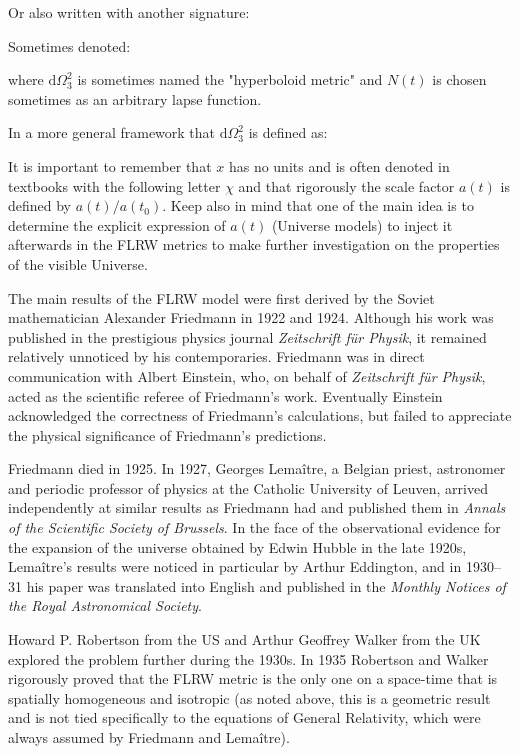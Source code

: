 	Or also written with another signature:
	
	Sometimes denoted:
	
	where $\mathrm{d}\Omega^2_3$ is sometimes named the "hyperboloid metric" and $N(t)$ is chosen sometimes as an arbitrary lapse function. 
	
	\begin{tcolorbox}[title=Remark,colframe=black,arc=10pt]
	In a more general framework that $\mathrm{d}\Omega^2_3$ is defined as:
	
	\end{tcolorbox}
	
	It is important to remember that $x$ has no units and is often denoted in textbooks with the following letter $\chi$ and that rigorously the scale factor $a(t)$ is defined by $a(t)/a(t_0)$. Keep also in mind that one of the main idea is to determine the explicit expression of $a(t)$ (Universe models) to inject it afterwards in the FLRW metrics to make further investigation on the properties of the visible Universe.

	The main results of the FLRW model were first derived by the Soviet mathematician Alexander Friedmann in 1922 and 1924. Although his work was published in the prestigious physics journal \textit{Zeitschrift für Physik}, it remained relatively unnoticed by his contemporaries. Friedmann was in direct communication with Albert Einstein, who, on behalf of \textit{Zeitschrift für Physik}, acted as the scientific referee of Friedmann's work. Eventually Einstein acknowledged the correctness of Friedmann's calculations, but failed to appreciate the physical significance of Friedmann's predictions.
	
	Friedmann died in 1925. In 1927, Georges Lemaître, a Belgian priest,	astronomer and periodic professor of physics at the Catholic University of Leuven, arrived independently at similar results as Friedmann had and published them in \textit{Annals of the Scientific Society of Brussels}. In the face of the observational evidence for the expansion of the universe obtained by Edwin Hubble in the late 1920s, Lemaître's results were noticed in particular by Arthur Eddington, and in 1930–31 his paper was translated into English and published in the \textit{Monthly Notices of the Royal Astronomical Society}.

	Howard P. Robertson from the US and Arthur Geoffrey Walker from the UK explored the problem further during the 1930s. In 1935 Robertson and Walker rigorously proved that the FLRW metric is the only one on a space-time that is spatially homogeneous and isotropic (as noted above, this is a geometric result and is not tied specifically to the equations of General Relativity, which were always assumed by Friedmann and Lemaître).

